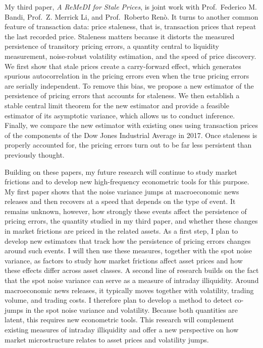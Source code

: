 \documentclass[12pt,a4paper]{article}
\begin{document}
My third paper, \textit{A ReMeDI for Stale Prices},
is joint work with Prof.~Federico M. Bandi, Prof.~Z. Merrick Li, and Prof.~Roberto Ren\`o.
It turns to another common feature of transaction data:
price staleness, that is, transaction prices that repeat the last recorded price.
Staleness matters because it distorts the measured persistence of transitory pricing errors,
a quantity central to liquidity measurement, noise-robust volatility estimation,
and the speed of price discovery.
We first show that stale prices create a carry-forward effect,
which generates spurious autocorrelation in the pricing errors
even when the true pricing errors are serially independent.
To remove this bias, we propose a new estimator of the persistence of pricing errors
that accounts for staleness.
We then establish a stable central limit theorem for the new estimator
and provide a feasible estimator of its asymptotic variance, which allows us to conduct inference.
Finally, we compare the new estimator with existing ones
using transaction prices of the components of the Dow Jones Industrial Average in 2017.
Once staleness is properly accounted for, the pricing errors turn out to be
far less persistent than previously thought.

Building on these papers, my future research will continue to study market frictions
and to develop new high-frequency econometric tools for this purpose.
My first paper shows that the noise variance jumps
at macroeconomic news releases and then recovers at a speed that depends on the type of event.
It remains unknown, however, how strongly these events affect the persistence of pricing errors,
the quantity studied in my third paper, and whether these changes in market frictions are priced in the related assets.
As a first step, I plan to develop new estimators that track
how the persistence of pricing errors changes around such events.
I will then use these measures, together with the spot noise variance,
as factors to study how market frictions affect asset prices
and how these effects differ across asset classes.
A second line of research builds on the fact that the spot noise variance
can serve as a measure of intraday illiquidity.
Around macroeconomic news releases, it typically moves together with
volatility, trading volume, and trading costs.
I therefore plan to develop a method to detect co-jumps
in the spot noise variance and volatility.
Because both quantities are latent, this requires new econometric tools.
This research will complement existing measures of intraday illiquidity
and offer a new perspective on how market microstructure
relates to asset prices and volatility jumps.
\end{document}
